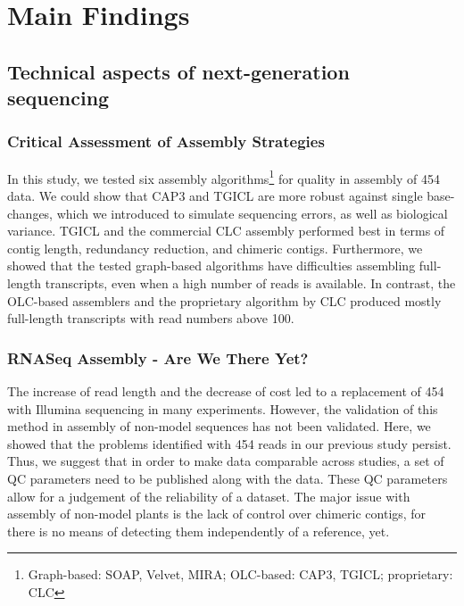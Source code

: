 \chapter{Main Findings} %

\section{Technical aspects of next-generation sequencing}
\subsection{Critical Assessment of Assembly Strategies
\cite{mp_Braeutigam2011}}

In this study, we tested six assembly algorithms\footnote{Graph-based: SOAP, Velvet, MIRA; OLC-based: CAP3, TGICL; proprietary: CLC} for quality in  assembly of 454 data. We could show that CAP3 and TGICL are more robust against single base-changes, which we introduced to simulate sequencing errors, as well as biological variance. TGICL and the commercial CLC  assembly performed best in terms of contig length, redundancy reduction, and chimeric contigs.
Furthermore, we showed that the tested graph-based algorithms have difficulties assembling full-length transcripts, even when a high number of reads is available. In contrast, the OLC-based assemblers and the proprietary algorithm by CLC produced mostly full-length transcripts with read numbers above 100.

\subsection{RNASeq Assembly - Are We There Yet?
\cite{mp_Schliesky2012}}

The increase of read length and the decrease of cost led to a replacement of 454 with Illumina sequencing in many experiments. However, the validation of this method in  assembly of non-model sequences has not been validated. Here, we showed that the problems identified with 454 reads in our previous study \cite{mp_Braeutigam2011} persist. Thus, we suggest that in order to make data comparable across studies, a set of \ac{QC} parameters need to be published along with the data. These \ac{QC} parameters allow for a judgement of the reliability of a dataset.
The major issue with  assembly of non-model plants is the lack of control over chimeric contigs, for there is no means of detecting them independently of a reference, yet.

